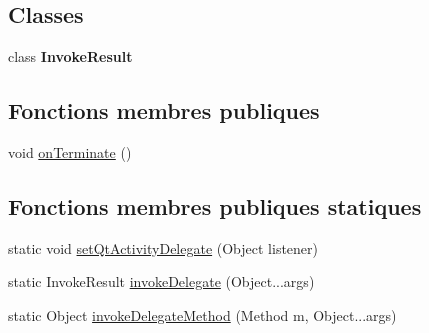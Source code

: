 \subsection*{Classes}
\begin{DoxyCompactItemize}
\item 
class {\bfseries Invoke\-Result}
\end{DoxyCompactItemize}
\subsection*{Fonctions membres publiques}
\begin{DoxyCompactItemize}
\item 
void \hyperlink{classorg_1_1qtproject_1_1qt5_1_1android_1_1bindings_1_1_qt_application_a643840ad1a423ebcae10f20c6dcf98d0}{on\-Terminate} ()
\end{DoxyCompactItemize}
\subsection*{Fonctions membres publiques statiques}
\begin{DoxyCompactItemize}
\item 
static void \hyperlink{classorg_1_1qtproject_1_1qt5_1_1android_1_1bindings_1_1_qt_application_ac47f64e358a18d99b3f41756fe4a7849}{set\-Qt\-Activity\-Delegate} (Object listener)
\item 
static Invoke\-Result \hyperlink{classorg_1_1qtproject_1_1qt5_1_1android_1_1bindings_1_1_qt_application_a8e4549506cfd078644266970e25dd1c5}{invoke\-Delegate} (Object...\-args)
\item 
static Object \hyperlink{classorg_1_1qtproject_1_1qt5_1_1android_1_1bindings_1_1_qt_application_a2c90af718c6bbd962d96589337a754ea}{invoke\-Delegate\-Method} (Method m, Object...\-args)
\end{DoxyCompactItemize}
